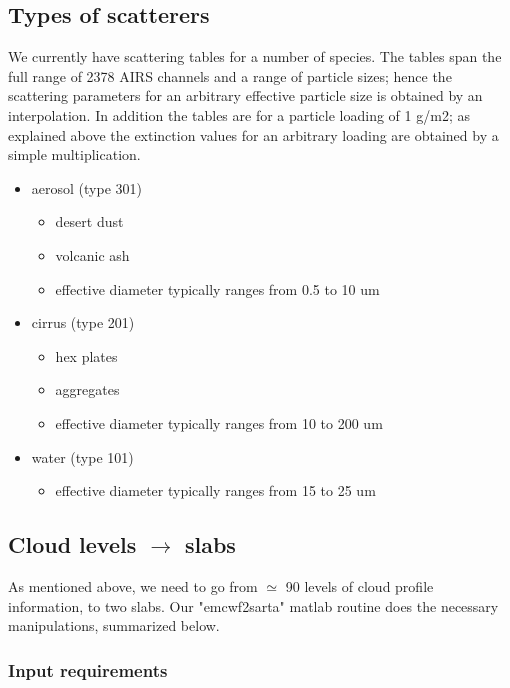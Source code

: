 \documentclass[11pt]{article}
\begin{document}
\subsection{Types of scatterers}
We currently have scattering tables for a number of species. The tables span the full range of 2378 AIRS channels and a 
range of particle sizes; hence the scattering parameters for an arbitrary effective particle size is obtained by an 
interpolation. In addition the tables are for a particle loading of 1 g/m2; as explained above the extinction values for 
an arbitrary loading are obtained by a simple multiplication.
\begin{itemize}
  \item aerosol (type 301)
    \begin{itemize}
      \item desert dust
      \item volcanic ash
      \item effective diameter typically ranges from 0.5 to 10 um
    \end{itemize}
  \item cirrus (type 201)
    \begin{itemize}
      \item hex plates
      \item aggregates
      \item effective diameter typically ranges from 10 to 200 um
    \end{itemize}
  \item water (type 101)
    \begin{itemize}
      \item effective diameter typically ranges from 15 to 25 um
    \end{itemize}
\end{itemize}

\subsection{Cloud levels $\rightarrow$ slabs}

As mentioned above, we need to go from $\simeq$ 90 levels of cloud profile information, to two slabs. Our 
"emcwf2sarta" matlab routine does the necessary manipulations, summarized below. 

\subsubsection{Input requirements}
\end{document}

